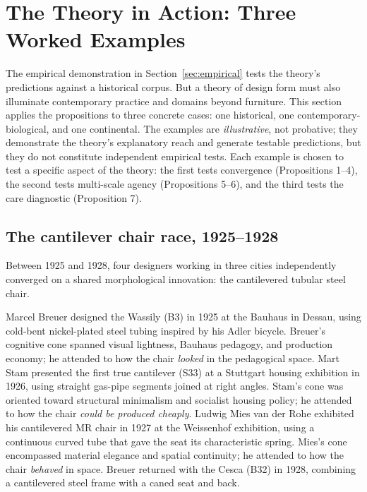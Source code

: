 \section{The Theory in Action: Three Worked Examples}
\label{sec:examples}

The empirical demonstration in Section~\ref{sec:empirical} tests the theory's predictions against a historical corpus. But a theory of design form must also illuminate contemporary practice and domains beyond furniture. This section applies the propositions to three concrete cases: one historical, one contemporary-biological, and one continental. The examples are \textit{illustrative}, not probative; they demonstrate the theory's explanatory reach and generate testable predictions, but they do not constitute independent empirical tests. Each example is chosen to test a specific aspect of the theory: the first tests convergence (Propositions 1--4), the second tests multi-scale agency (Propositions 5--6), and the third tests the care diagnostic (Proposition 7).

\subsection{The cantilever chair race, 1925--1928}

Between 1925 and 1928, four designers working in three cities independently converged on a shared morphological innovation: the cantilevered tubular steel chair.

Marcel Breuer designed the Wassily (B3) in 1925 at the Bauhaus in Dessau, using cold-bent nickel-plated steel tubing inspired by his Adler bicycle. Breuer's cognitive cone spanned visual lightness, Bauhaus pedagogy, and production economy; he attended to how the chair \textit{looked} in the pedagogical space. Mart Stam presented the first true cantilever (S33) at a Stuttgart housing exhibition in 1926, using straight gas-pipe segments joined at right angles. Stam's cone was oriented toward structural minimalism and socialist housing policy; he attended to how the chair \textit{could be produced cheaply}. Ludwig Mies van der Rohe exhibited his cantilevered MR chair in 1927 at the Weissenhof exhibition, using a continuous curved tube that gave the seat its characteristic spring. Mies's cone encompassed material elegance and spatial continuity; he attended to how the chair \textit{behaved} in space. Breuer returned with the Cesca (B32) in 1928, combining a cantilevered steel frame with a caned seat and back.

